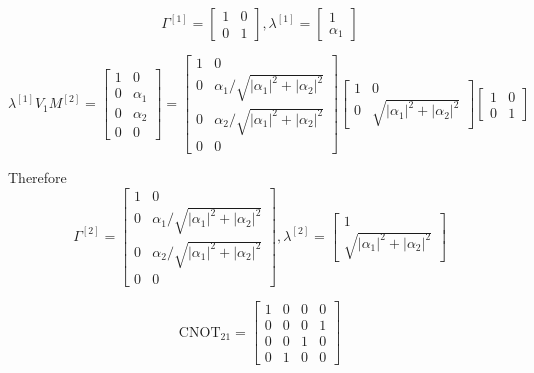 \documentclass[11pt, oneside]{article}   	%
\begin{document}
\begin{equation}
\Gamma^{[1]} = 
\begin{bmatrix}
1 & 0 \\
0 & 1
\end{bmatrix},
\lambda^{[1]} = 
\begin{bmatrix}
1 \\
\alpha_1
\end{bmatrix}
\end{equation}

\begin{equation}
\lambda^{[1]} V_1 M^{[2]} 
= 
\begin{bmatrix}
1 & 0 \\
0 & \alpha_1\\
0 & \alpha_2 \\
0 & 0
\end{bmatrix}
=
\begin{bmatrix}
1 & 0 \\
0 & \alpha_1 / \sqrt{|\alpha_1|^2 + |\alpha_2|^2} \\
0 & \alpha_2 / \sqrt{|\alpha_1|^2 + |\alpha_2|^2} \\
0 & 0
\end{bmatrix}
\begin{bmatrix}
1 & 0 \\
0 & \sqrt{|\alpha_1|^2 + |\alpha_2|^2} 
\end{bmatrix}
\begin{bmatrix}
1 & 0 \\
0 & 1
\end{bmatrix}
\end{equation}

Therefore
\begin{equation}
\Gamma^{[2]} = 
\begin{bmatrix}
1 & 0 \\
0 & \alpha_1 / \sqrt{|\alpha_1|^2 + |\alpha_2|^2} \\
0 & \alpha_2 / \sqrt{|\alpha_1|^2 + |\alpha_2|^2} \\
0 & 0
\end{bmatrix},
\lambda^{[2]} = 
\begin{bmatrix}
1 \\
\sqrt{|\alpha_1|^2 + |\alpha_2|^2} 
\end{bmatrix}
\end{equation}


\begin{equation}
\mathrm{CNOT}_{21} = 
\begin{bmatrix}
1 & 0 & 0 & 0 \\
0 & 0 & 0 & 1 \\
0 & 0 & 1 & 0 \\
0 & 1 & 0 & 0
\end{bmatrix}
\end{equation}
\end{document}
